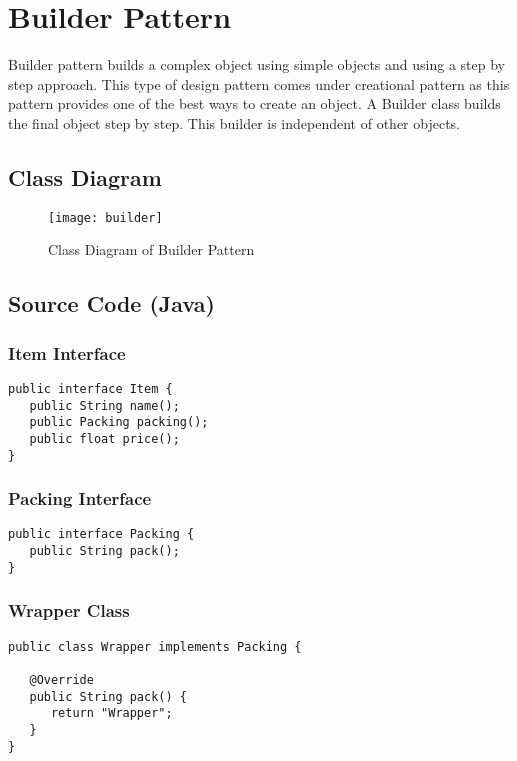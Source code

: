 \newpage
\section{Builder Pattern}

Builder pattern builds a complex object using simple objects and using a step by step approach. This type of design pattern comes under creational pattern as this pattern provides one of the best ways to create an object.
A Builder class builds the final object step by step. This builder is independent of other objects.

\subsection{Class Diagram}

\begin{figure}[h]
\centering
\texttt{[image: builder]}
\caption{Class Diagram of Builder Pattern}
\end{figure}

\newpage
\subsection{Source Code (Java)}

\subsubsection{Item Interface}

\begin{verbatim}
public interface Item {
   public String name();
   public Packing packing();
   public float price();	
}
\end{verbatim}

\subsubsection{Packing Interface}

\begin{verbatim}
public interface Packing {
   public String pack();
}
\end{verbatim}

\subsubsection{Wrapper Class}

\begin{verbatim}
public class Wrapper implements Packing {

   @Override
   public String pack() {
      return "Wrapper";
   }
}
\end{verbatim}

